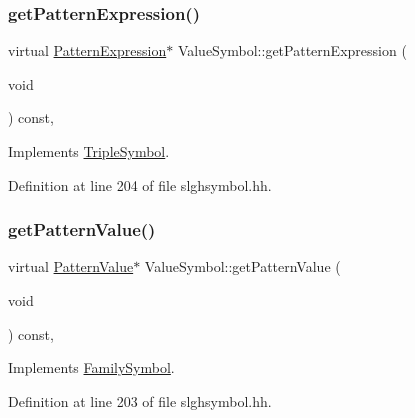 \subsubsection{\texorpdfstring{getPatternExpression()}{getPatternExpression()}}
{\footnotesize\ttfamily virtual \mbox{\hyperlink{class_pattern_expression}{Pattern\+Expression}}$\ast$ Value\+Symbol\+::get\+Pattern\+Expression (\begin{DoxyParamCaption}\item[{void}]{ }\end{DoxyParamCaption}) const\hspace{0.3cm}{\ttfamily [inline]}, {\ttfamily [virtual]}}



Implements \mbox{\hyperlink{class_triple_symbol_a213895658c5fe547edf9ac54a1d2de2e}{Triple\+Symbol}}.



Definition at line 204 of file slghsymbol.\+hh.

\mbox{\label{class_value_symbol_a449457fadde51b9fe2c3a8d3a76966c9}} 
\subsubsection{\texorpdfstring{getPatternValue()}{getPatternValue()}}
{\footnotesize\ttfamily virtual \mbox{\hyperlink{class_pattern_value}{Pattern\+Value}}$\ast$ Value\+Symbol\+::get\+Pattern\+Value (\begin{DoxyParamCaption}\item[{void}]{ }\end{DoxyParamCaption}) const\hspace{0.3cm}{\ttfamily [inline]}, {\ttfamily [virtual]}}



Implements \mbox{\hyperlink{class_family_symbol_a4918a769969008aeaa7a5cbe0eff90ac}{Family\+Symbol}}.



Definition at line 203 of file slghsymbol.\+hh.

